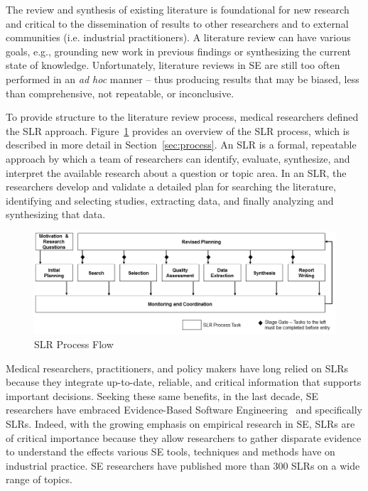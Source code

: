 The review and synthesis of existing literature is foundational for new research and critical to the dissemination of results to other researchers and to external communities (i.e. industrial practitioners). 
A literature review can have various goals, e.g., grounding new work in previous findings or synthesizing the current state of knowledge.
Unfortunately, literature reviews in SE are still too often performed in an \textit{ad hoc} manner -- thus producing results that may be biased, less than comprehensive, not repeatable, or inconclusive.

To provide structure to the literature review process, medical researchers defined the SLR approach. 
Figure~\ref{figure-SLR-Process} provides an overview of the SLR process, which is described in more detail in Section~\ref{sec:process}.
An SLR is a formal, repeatable approach by which a team of researchers can identify, evaluate, synthesize, and interpret the available research about a question or topic area. 
In an SLR, the researchers develop and validate a detailed plan for searching the literature, identifying and selecting studies, extracting data, and finally analyzing and synthesizing that data.

\begin{figure}
	\centering
	\includegraphics[width=\textwidth]{SLR_Process_Flow}
	\caption{SLR Process Flow}
	\label{figure-SLR-Process}
\end{figure}

Medical researchers, practitioners, and policy makers have long relied on SLRs because they integrate up-to-date, reliable, and critical information that supports important decisions.
Seeking these same benefits, in the last decade, SE researchers have embraced Evidence-Based Software Engineering~\cite{Kitchenham-etal:04, Kitchenham:04} and specifically SLRs.
Indeed, with the growing emphasis on empirical research in SE, SLRs are of critical importance because they allow researchers to gather disparate evidence to understand the effects various SE tools, techniques and methods have on industrial practice. 
SE researchers have published more than 300 SLRs on a wide range of topics.

